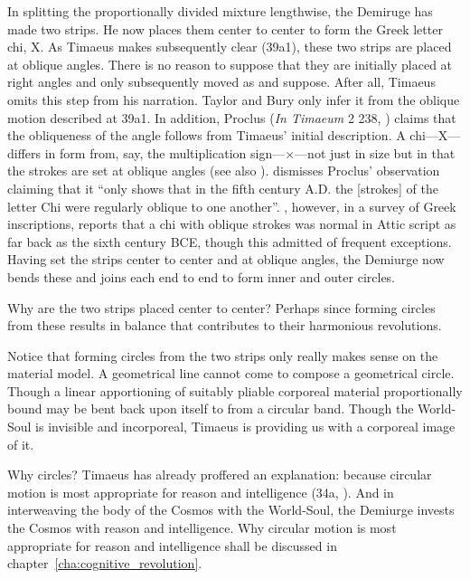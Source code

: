 In splitting the proportionally divided mixture lengthwise, the Demiruge has made two strips. He now places them center to center to form the Greek letter chi, {\sbl Χ}. As Timaeus makes subsequently clear (39a1), these two strips are placed at oblique angles. There is no reason to suppose that they are initially placed at right angles and only subsequently moved as \citet[147]{Taylor:1928qb} and \citet[36 n1]{Bury:1929jb} suppose. After all, Timaeus omits this step from his narration. Taylor and Bury only infer it from the oblique motion described at 39a1. In addition, Proclus (\emph{In Timaeum} 2 238, \citealt{Diehl:1903re}) claims that the obliqueness of the angle follows from Timaeus' initial description. A chi---{\sbl Χ}---differs in form from, say, the multiplication sign---×---not just in size but in that the strokes are set at oblique angles (see also \citealt[111 n7]{Archer-Hind:1888qd}). \citet[147 n1]{Taylor:1928qb} dismisses Proclus' observation claiming that it ``only shows that in the fifth century \textsc{A}.\textsc{D}. the [strokes] of the letter Chi were regularly oblique to one another''. \citet[67]{Jeffrey:1961aa}, however, in a survey of Greek inscriptions, reports that a chi with oblique strokes was normal in Attic script as far back as the sixth century \textsc{BCE}, though this admitted of frequent exceptions. Having set the strips center to center and at oblique angles, the Demiurge now bends these and joins each end to end to form inner and outer circles. 

Why are the two strips placed center to center? Perhaps since forming circles from these results in balance that contributes to their harmonious revolutions.

Notice that forming circles from the two strips only really makes sense on the material model. A geometrical line cannot come to compose a geometrical circle. Though a linear apportioning of suitably pliable corporeal material proportionally bound may be bent back upon itself to from a circular band. Though the World-Soul is invisible and incorporeal, Timaeus is providing us with a corporeal image of it.

Why circles? Timaeus has already proffered an explanation: because circular motion is most appropriate for reason and intelligence (34a, \citealt[31]{Vlastos:1975aa}). And in interweaving the body of the Cosmos with the World-Soul, the Demiurge invests the Cosmos with reason and intelligence. Why circular motion is most appropriate for reason and intelligence shall be discussed in chapter~\ref{cha:cognitive_revolution}.

